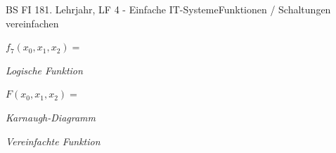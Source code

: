 \documentclass[oneside,openany,headings=optiontotoc,11pt,numbers=noenddot]{scrreprt}
\begin{document}
\begin{worksheet}{BS FI 18}{1. Lehrjahr, LF 4 - Einfache IT-Systeme}{Funktionen / Schaltungen vereinfachen}
\begin{framed}
			\(f_7(x_0,x_1,x_2) = \)\\
			\par\noindent
			\tiny{\textit{\color{codegray}Logische Funktion}}\\
			\par\noindent
			\par\noindent\normalsize
			\(F(x_0,x_1,x_2) = \)
		\end{framed}
		\begin{framed}
			\begin{minipage}{0.48\textwidth}
				\tiny{\textit{\color{codegray}Karnaugh-Diagramm}}\\
				\normalsize
			\end{minipage}
			\hfill
			\begin{minipage}{0.48\textwidth}
				\begin{minipage}{0.48\textwidth}
					\tiny{\textit{\color{codegray}Vereinfachte Funktion}}\\
					\normalsize
				\end{minipage}
			\end{minipage}
			\begin{minipage}{0.48\textwidth}
				
				\begin{karnaugh-map}[4][2][1][$x_1x_0$][$x_2$]
					

\end{karnaugh-map}
\end{minipage}
\end{framed}
\end{worksheet}
\end{document}
